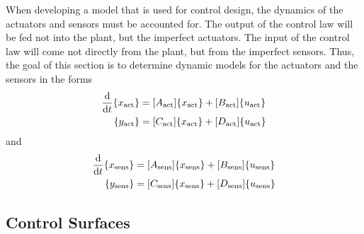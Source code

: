 When developing a model that is used for control design, the dynamics of the actuators and sensors must be accounted for. The output of the control law will be fed not into the plant, but the imperfect actuators. The input of the control law will come not directly from the plant, but from the imperfect sensors. Thus, the goal of this section is to determine dynamic models for the actuators and the sensors in the forms
\begin{equation}
\begin{aligned}
	\frac{\mathrm{d} }{\mathrm{d} t} \{x_\text{act}\} &= [A_\text{act}]\{x_\text{act}\}+[B_\text{act}]\{u_\text{act}\} \\
	\{y_\text{act}\} &= [C_\text{act}]\{x_\text{act}\}+[D_\text{act}]\{u_\text{act}\}
\end{aligned}
\end{equation}
and
\begin{equation}
\begin{aligned}
	\frac{\mathrm{d} }{\mathrm{d} t} \{x_\text{sens}\} &= [A_\text{sens}]\{x_\text{sens}\}+[B_\text{sens}]\{u_\text{sens}\} \\
	\{y_\text{sens}\} &= [C_\text{sens}]\{x_\text{sens}\}+[D_\text{sens}]\{u_\text{sens}\}
\end{aligned}
\end{equation}

\subsection{Control Surfaces} %

